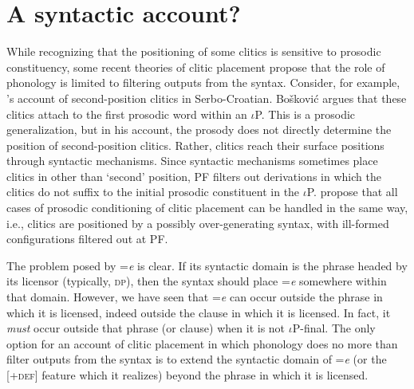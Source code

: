 \documentclass[output=paper,
modfonts
]{LSP/langsci}
\begin{document}
\section{A syntactic account?}
While recognizing that the positioning of some clitics is sensitive to prosodic constituency, some recent theories of
clitic placement propose that the role of phonology is limited to filtering outputs from the syntax. 
Consider, for example, \citet{boskovic2000}'s account of 
second-position clitics in Serbo-Croatian.
Bo\v{s}kovi\'{c} argues that these clitics attach to the first prosodic word within an $\iota$P. 
This is a prosodic generalization, but in his account, the prosody does not directly determine the position of second-position clitics. 
Rather, clitics reach their surface positions through syntactic mechanisms.
Since syntactic mechanisms sometimes place clitics in other than `second' position, PF filters out derivations 
in which the clitics do not suffix to the initial prosodic constituent in the $\iota$P. 
\citet{otero2011} propose that all cases of prosodic conditioning of clitic placement can be handled in the same way,
i.e., clitics are positioned by a possibly over-generating syntax, with ill-formed configurations filtered out at PF.

The problem posed by =\emph{e} is clear.   If its syntactic domain is the phrase headed by its licensor (typically, \textsc{dp}), 
then the syntax should place =\emph{e} somewhere within that domain.
However, we have seen that =\emph{e} can occur outside the phrase in which it is licensed, indeed outside the  
clause in which it is licensed. In fact, it \emph{must} occur outside that phrase (or clause) when it is not $\iota$P-final.
The only option for  an account of clitic placement in which phonology does no more than filter outputs from the syntax is to extend
 the syntactic domain of =\emph{e} (or the [+\textsc{def}] feature which it realizes) beyond  the 
phrase in which it is licensed. 
 
\end{document}
